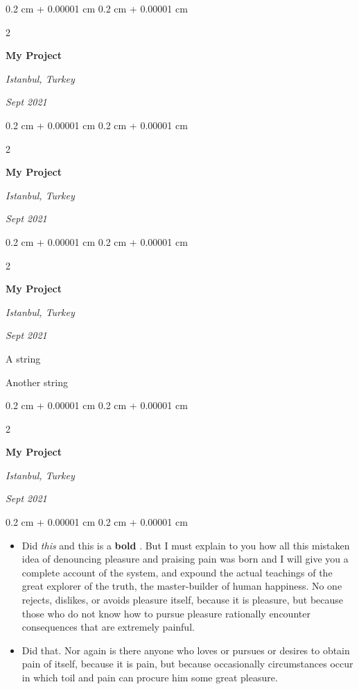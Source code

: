 \documentclass[10pt, letterpaper]{article}
\newenvironment{summary}{
    \begin{description}[
        topsep=0.10 cm,
        parsep=0.10 cm,
        partopsep=0pt,
        itemsep=0pt,
        leftmargin=0.4 cm + 10pt
    ]
}{
    \end{description}
} %
\newenvironment{highlights}{
    \begin{itemize}[
        topsep=0.10 cm,
        parsep=0.10 cm,
        partopsep=0pt,
        itemsep=0pt,
        leftmargin=0.4 cm + 10pt
    ]
}{
    \end{itemize}
} %
\newenvironment{onecolentry}{
    \begin{adjustwidth}{
        0.2 cm + 0.00001 cm
    }{
        0.2 cm + 0.00001 cm
    }
}{
    \end{adjustwidth}
} %
\newenvironment{twocolentry}[2][]{
    \onecolentry
    \def\secondColumn{#2}
    \setcolumnwidth{\fill, 4.5 cm}
    \begin{paracol}{2}
}{
    \switchcolumn \raggedleft \secondColumn
    \end{paracol}
    \endonecolentry
} %
\let\hrefWithoutArrow\href
\renewcommand{\href}[2]{\hrefWithoutArrow{#1}{\ifthenelse{\equal{#2}{}}{ }{#2 }\raisebox{.15ex}{\footnotesize \faExternalLink*}}}
\begin{document}
        \vspace{0.2 cm}

        \begin{twocolentry}{
        \textit{Istanbul, Turkey}    
            
        \textit{Sept 2021}}
            \textbf{My Project}
        \end{twocolentry}


        \vspace{0.2 cm}

        \begin{twocolentry}{
        \textit{Istanbul, Turkey}    
            
        \textit{Sept 2021}}
            \textbf{My Project}
        \end{twocolentry}


        \vspace{0.2 cm}

        \begin{twocolentry}{
        \textit{Istanbul, Turkey}    
            
        \textit{Sept 2021}}
            \textbf{My Project}
        \end{twocolentry}
            \begin{summary}
                \item A string
                \item Another string
            \end{summary}


        \vspace{0.2 cm}

        \begin{twocolentry}{
        \textit{Istanbul, Turkey}    
            
        \textit{Sept 2021}}
            \textbf{My Project}
        \end{twocolentry}
        \vspace{0.10 cm}
        \begin{onecolentry}
            \begin{highlights}
                \item Did \textit{this} and this is a \textbf{bold} \href{https://example.com}{link}. But I must explain to you how all this mistaken idea of denouncing pleasure and praising pain was born and I will give you a complete account of the system, and expound the actual teachings of the great explorer of the truth, the master-builder of human happiness. No one rejects, dislikes, or avoids pleasure itself, because it is pleasure, but because those who do not know how to pursue pleasure rationally encounter consequences that are extremely painful.
                \item Did that. Nor again is there anyone who loves or pursues or desires to obtain pain of itself, because it is pain, but because occasionally circumstances occur in which toil and pain can procure him some great pleasure.
            \end{highlights}
        \end{onecolentry}
\end{document}
